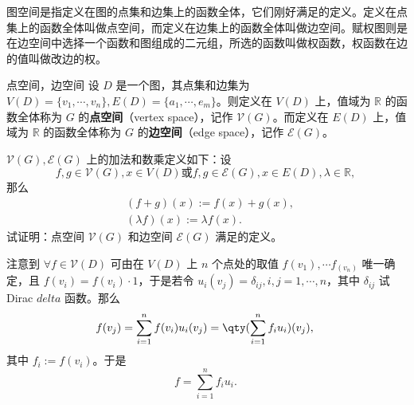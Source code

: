 
图空间是指定义在图的点集和边集上的函数全体，它们刚好满足的定义。定义在点集上的函数全体叫做点空间，而定义在边集上的函数全体叫做边空间。赋权图则是在边空间中选择一个函数和图组成的二元组，所选的函数叫做权函数，权函数在边的值叫做改边的权。

\begin{definition}{点空间，边空间}
设 $D$ 是一个图，其点集和边集为 $V(D)=\{v_1,\cdots,v_n\},E(D)=\{a_1,\cdots,e_m\}$。则定义在 $V(D)$ 上，值域为 $\mathbb R$ 的函数全体称为 $G$ 的\textbf{点空间}（vertex space），记作 $\mathcal V(G)$。而定义在 $E(D)$ 上，值域为 $\mathbb R$ 的函数全体称为 $G$ 的\textbf{边空间}（edge space），记作 $\mathcal E(G)$。
\end{definition}


\begin{exercise}{}
 $\mathcal V(G),\mathcal E(G)$ 上的加法和数乘定义如下：设
\begin{equation}
f,g\in\mathcal V(G),x\in V(D)\text{或} f,g\in\mathcal E(G),x\in E(D),\lambda\in \mathbb R,~
\end{equation}
那么
\begin{equation}
\begin{aligned}
&(f+g)(x):=f(x)+g(x),\\
&(\lambda f)(x):=\lambda f(x).
\end{aligned}~
\end{equation}
试证明：点空间 $\mathcal V(G)$ 和边空间 $\mathcal E(G)$ 满足的定义。
\end{exercise}

注意到 $\forall f\in\mathcal V(D)$ 可由在 $V(D)$ 上 $n$ 个点处的取值 $f(v_1),\cdots f_(v_n)$ 唯一确定，且 $f(v_i)=f(v_i)\cdot 1$，于是若令 $u_i(v_j)=\delta_{ij},i,j=1,\cdots,n$，其中 $\delta_{ij}$ 试Dirac $delta$ 函数。那么
\begin{equation}
f(v_j)=\sum_{i=1}^n f(v_i)u_i(v_j)=\qty(\sum_{i=1}^n f_iu_i)(v_j),~
\end{equation}
其中 $f_i:=f(v_i)$。于是
\begin{equation}
f=\sum_{i=1}^n f_iu_i.~
\end{equation}













